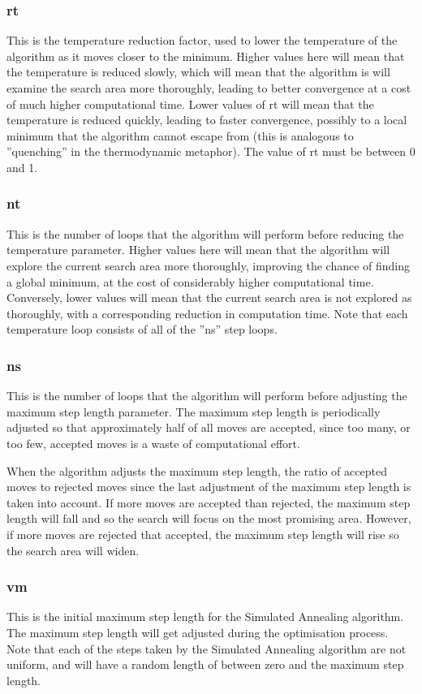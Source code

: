 \documentclass [a4paper, 10pt]{book}
\begin{document}
\subsubsection{rt}
This is the temperature reduction factor, used to lower the temperature of the algorithm as it moves closer to the minimum.  Higher values here will mean that the temperature is reduced slowly, which will mean that the algorithm is will examine the search area more thoroughly, leading to better convergence at a cost of much higher computational time.  Lower values of rt will mean that the temperature is reduced quickly, leading to faster convergence, possibly to a local minimum that the algorithm cannot escape from (this is analogous to ''quenching'' in the thermodynamic metaphor).  The value of rt must be between 0 and 1.

\subsubsection{nt}
This is the number of loops that the algorithm will perform before reducing the temperature parameter.  Higher values here will mean that the algorithm will explore the current search area more thoroughly, improving the chance of finding a global minimum, at the cost of considerably higher computational time.  Conversely, lower values will mean that the current search area is not explored as thoroughly, with a corresponding reduction in computation time.  Note that each temperature loop consists of all of the ''ns'' step loops.

\subsubsection{ns}
This is the number of loops that the algorithm will perform before adjusting the maximum step length parameter.  The maximum step length is periodically adjusted so that approximately half of all moves are accepted, since too many, or too few, accepted moves is a waste of computational effort.

\bigskip
When the algorithm adjusts the maximum step length, the ratio of accepted moves to rejected moves since the last adjustment of the maximum step length is taken into account.  If more moves are accepted than rejected, the maximum step length will fall and so the search will focus on the most promising area.  However, if more moves are rejected that accepted, the maximum step length will rise so the search area will widen.

\subsubsection{vm}
This is the initial maximum step length for the Simulated Annealing algorithm.  The maximum step length will get adjusted during the optimisation process.  Note that each of the steps taken by the Simulated Annealing algorithm are not uniform, and will have a random length of between zero and the maximum step length.
\end{document}
